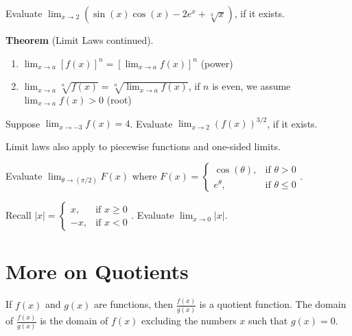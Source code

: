 \documentclass[../main.tex]{subfiles}
\begin{document}
\begin{example}
  Evaluate \(\lim_{x \to 2} \left(\sin(x)\cos(x) - 2 e^{x} + \sqrt[3]{x}\right)\), if it exists.
\end{example}
\clearpage

\begin{mdframed}[style=withref]
  \textbf{Theorem} (Limit Laws continued).
  \begin{enumerate}[label=(\arabic*), start=6]
    \item \(\lim_{x \to a} [f(x)]^{n} = \left[ \lim_{x \to a} f(x) \right]^{n}\) \hfill (power)
    \item \(\lim_{x \to a} \sqrt[n]{f(x)} = \sqrt[n]{\lim_{x \to a} f(x)}\), \quad if \(n\) is even, we assume {\(\lim_{x \to a} f(x) > 0\)} \hfill (root)
  \end{enumerate}

\end{mdframed}

\begin{example}
  Suppose \(\lim_{x \to -3}f(x) = 4\). Evaluate \(\lim_{x \to 2} (f(x))^{3/2}\), if it exists.
\end{example}

\faLightbulb{} Limit laws also apply to piecewise functions and one-sided limits.
\begin{example}
  Evaluate \(\lim_{\theta \to (\pi/2)} F(x)\) where \(F(x) = \begin{cases} \cos(\theta), & \text{if } \theta > 0 \\ e^{\theta}, &\text{if } \theta \le 0 \end{cases}\).
\end{example}
\begin{example}
  Recall \(|x| = \begin{cases} x, &\text{if } x \ge 0 \\ -x, &\text{if } x < 0 \end{cases}\). Evaluate \(\lim_{x \to 0} |x|\).
\end{example}
\clearpage

\section{More on Quotients}\label{sec:quotients}

If \(f(x)\) and \(g(x)\) are functions, then \(\frac{f(x)}{g(x)}\) is a {quotient} function. The domain of \(\frac{f(x)}{g(x)}\) is the domain of \(f(x)\) excluding the numbers \(x\) such that {\(g(x) = 0\).}
\end{document}
